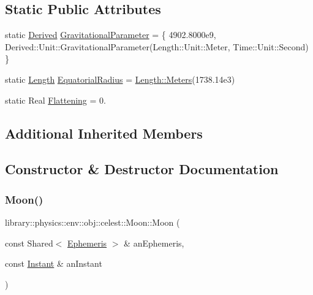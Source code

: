 \subsection*{Static Public Attributes}
\begin{DoxyCompactItemize}
\item 
static \hyperlink{classlibrary_1_1physics_1_1units_1_1_derived}{Derived} \hyperlink{classlibrary_1_1physics_1_1env_1_1obj_1_1celest_1_1_moon_a3ef853ee9345bbad3e58d7f0a9d14030}{Gravitational\+Parameter} = \{ 4902.\+8000e9, Derived\+::\+Unit\+::\+Gravitational\+Parameter(\+Length\+::\+Unit\+::\+Meter, Time\+::\+Unit\+::\+Second) \}
\item 
static \hyperlink{classlibrary_1_1physics_1_1units_1_1_length}{Length} \hyperlink{classlibrary_1_1physics_1_1env_1_1obj_1_1celest_1_1_moon_a6b22597902ccee09be70ae4eecca2174}{Equatorial\+Radius} = \hyperlink{classlibrary_1_1physics_1_1units_1_1_length_ad523a3737d5c3f23a64588eac83f2148}{Length\+::\+Meters}(1738.\+14e3)
\item 
static Real \hyperlink{classlibrary_1_1physics_1_1env_1_1obj_1_1celest_1_1_moon_a02e660fcf1bf06697a037a354f698499}{Flattening} = 0.
\end{DoxyCompactItemize}
\subsection*{Additional Inherited Members}


\subsection{Constructor \& Destructor Documentation}
\mbox{\label{classlibrary_1_1physics_1_1env_1_1obj_1_1celest_1_1_moon_a14666407b72dbdc6632fe6f735654432}} 
\subsubsection{\texorpdfstring{Moon()}{Moon()}}
{\footnotesize\ttfamily library\+::physics\+::env\+::obj\+::celest\+::\+Moon\+::\+Moon (\begin{DoxyParamCaption}\item[{const Shared$<$ \hyperlink{classlibrary_1_1physics_1_1env_1_1_ephemeris}{Ephemeris} $>$ \&}]{an\+Ephemeris,  }\item[{const \hyperlink{classlibrary_1_1physics_1_1time_1_1_instant}{Instant} \&}]{an\+Instant }\end{DoxyParamCaption})}

